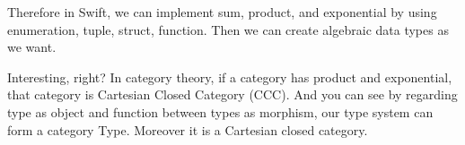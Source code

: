 \documentclass{article}
\begin{document}
Therefore in Swift, we can implement sum, product, and exponential by using enumeration, tuple, struct, function. Then we can create algebraic data types as we want.

Interesting, right? In category theory, if a category has product and exponential, that category is Cartesian Closed Category (CCC). And you can see by regarding type as object and function between types as morphism, our type system can form a category Type. Moreover it is a Cartesian closed category.


%
%
\end{document}
